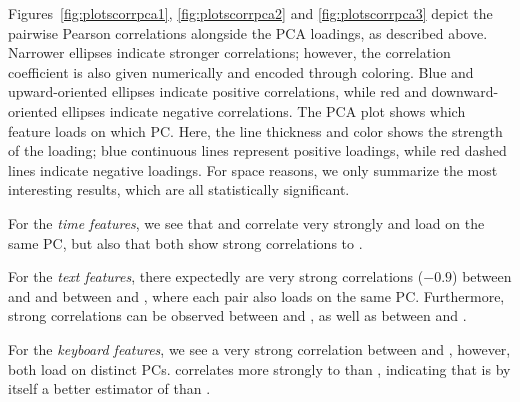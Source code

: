 \documentclass[output=paper]{langsci/langscibook}
\begin{document}
Figures~\ref{fig:plotscorrpca1}, \ref{fig:plotscorrpca2} and \ref{fig:plotscorrpca3} depict the pairwise Pearson correlations alongside the PCA loadings, as described above. Narrower ellipses indicate stronger correlations; however, the correlation coefficient is also given numerically and encoded through coloring. Blue and upward-oriented ellipses indicate positive correlations, while red and downward-oriented ellipses indicate negative correlations. The PCA plot shows which feature loads on which PC. Here, the line thickness and color shows the strength of the loading; blue continuous lines represent positive loadings, while red dashed lines indicate negative loadings.
For space reasons, we only summarize the most interesting results, which are all statistically significant.

For the \textit{time features}, we see that \petime{} and \lnpetime{} correlate very strong\-ly and load on the same PC, but also that both show strong correlations to \subjCL{}. %

For the \textit{text features}, there expectedly are very strong correlations ($-0.9$) between \ter{} and \bleu{} and between \hter{} and \hbleu{}, where each pair also loads on the same PC. Furthermore, strong correlations can be observed between \ter{} and \hter{}, as well as between \bleu{} and \hbleu{}. %

For the \textit{keyboard features}, we see a very strong correlation between \apr{} and \pwr{}, however, both load on distinct PCs.
\pwr{} correlates more strongly to\linebreak\subjCL{} than \apr{}, indicating that \pwr{} is by itself a better estimator of \subjCL{} than \apr{}.

\end{document}
